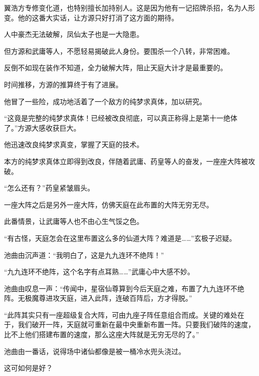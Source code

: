 \begin{this_body}
翼浩方专修变化道，也特别擅长加持别人。这是因为他有一记招牌杀招，名为人形变。他的这番大实话，让方源只好打消了这方面的期待。

人中豪杰无法破解，凤仙太子也是一大隐患。

但方源和武庸等人，不愿轻易揭破此人身份。要围杀一个八转，非常困难。

反倒不如现在装作不知道，全力破解大阵，阻止天庭大计才是最重要的。

时间推移，方源的推算终于有了进展。

他冒了一些险，成功地活着了一个敌方的纯梦求真体，加以研究。

“这竟是完整的纯梦求真体！已经被改良彻底，可以真正称得上是第十一绝体了。”方源大感收获巨大。

他迅速改良纯梦求真变，掌握了天庭的技术。

本方的纯梦求真体立即得到改良，伴随着武庸、药皇等人的奋发，一座座大阵被攻破。

“怎么还有？”药皇紧皱眉头。

一座大阵之后是另外一座大阵，仿佛天庭在此布置的大阵无穷无尽。

此番情景，让武庸等人也不由心生气馁之色。

“有古怪，天庭怎会在这里布置这么多的仙道大阵？难道是……”玄极子迟疑。

池曲由沉声道：“我明白了，这是九九连环不绝阵！”

“九九连环不绝阵，这个名字有点耳熟……”武庸心中大感不妙。

池曲由叹息一声：“传闻中，星宿仙尊算到今后天庭之难，布置了九九连环不绝阵。无极魔尊进攻天庭，进入此阵，连破百阵后，方才得脱。”

“此阵其实只有一座超级复合大阵，可由九座子阵任意组合而成。关键的难处在于，我们破开一阵，天庭就可重新在最中央重新布置一阵。只要我们破阵的速度，比不上他们搭建布置的速度，那么这座大阵就是无穷无尽的了。”

池曲由一番话，说得场中诸仙都像是被一桶冷水兜头浇过。

这可如何是好？

\end{this_body}

